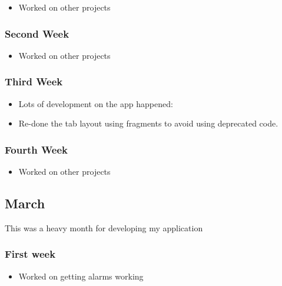 \begin{itemize}
\tightlist
\item
  Worked on other projects
\end{itemize}

\subsubsection{Second Week}\label{second-week-4}

\begin{itemize}
\tightlist
\item
  Worked on other projects
\end{itemize}

\subsubsection{Third Week}\label{third-week-3}

\begin{itemize}
\tightlist
\item
  Lots of development on the app happened:
\item
  Re-done the tab layout using fragments to avoid using deprecated code.
\end{itemize}

\subsubsection{Fourth Week}\label{fourth-week-3}

\begin{itemize}
\tightlist
\item
  Worked on other projects
\end{itemize}

\subsection{March}\label{march}

This was a heavy month for developing my application

\subsubsection{First week}\label{first-week-5}

\begin{itemize}
\tightlist
\item
  Worked on getting alarms working
\end{itemize}

